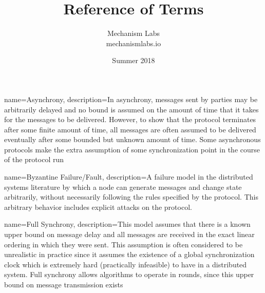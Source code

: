 \documentclass{article}
\title{Reference of Terms}
\author{\huge{Mechanism Labs}\\\small{mechanismlabs.io}}
\date{ Summer 2018}
\begin{document}
\maketitle

\addtolength{\oddsidemargin}{-.47in}
\addtolength{\evensidemargin}{-.47in}
\addtolength{\textwidth}{.95in}
\addtolength{\topmargin}{-.95in}
\addtolength{\textheight}{.95in}


{
    name=Asynchrony,
    description={In asynchrony, messages sent by parties may be arbitrarily delayed and no bound is assumed on the amount of time that it takes for the messages to be delivered. However, to show that the protocol terminates after some finite amount of time, all messages are often assumed to be delivered eventually after some bounded but unknown amount of time. Some asynchronous protocols make the extra assumption of some synchronization point in the course of the protocol run \cite{mahdiz}}
}

{
    name=Byzantine Failure/Fault,
    description={A failure model in the distributed systems literature by which a node can generate messages and change state arbitrarily, without necessarily following the rules specified by the protocol. This arbitrary behavior includes explicit attacks on the protocol. \cite{lynch}}
}

{
    name=Full Synchrony,
    description={This model assumes that there is a known upper bound on message delay and all messages are received in the exact linear ordering in which they were sent. This assumption is often considered to be unrealistic in practice since it assumes the existence of a global synchronization clock which is extremely hard (practically infeasible) to have in a distributed system. Full synchrony allows algorithms to operate in rounds, since this upper bound on message transmission exists \cite{mahdiz}}
}
\end{document}
